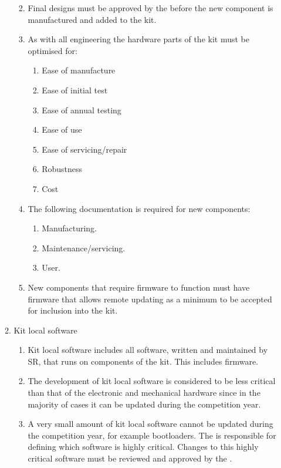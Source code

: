 \begin{draft}
\begin{enumerate}
\begin{enumerate}
\begin{enumerate}
\begin{enumerate}
          \end{enumerate}
        \item Final designs must be approved by the  before the new component is manufactured and added to the kit.
        \item As with all engineering the hardware parts of the kit must be optimised for:
          \begin{enumerate}
            \item Ease of manufacture
            \item Ease of initial test
            \item Ease of annual testing
            \item Ease of use
            \item Ease of servicing/repair
            \item Robustness
            \item Cost
          \end{enumerate}
        \item The following documentation is required for new components:
          \begin{enumerate}
            \item Manufacturing.
            \item Maintenance/servicing.
            \item User.
          \end{enumerate}
        \item New components that require firmware to function must have firmware that allows remote updating as a minimum to be accepted for inclusion into the kit.
      \end{enumerate}
    \item Kit local software
      \begin{enumerate}
        \item Kit local software includes all software, written and maintained by SR, that runs on components of the kit. This includes firmware.
        \item The development of kit local software is considered to be less critical than that of the electronic and mechanical hardware since in the majority of cases it can be updated during the competition year.
        \item A very small amount of kit local software cannot be updated during the competition year, for example bootloaders. The  is responsible for defining which software is highly critical. Changes to this highly critical software must be reviewed and approved by the .

\end{enumerate}
\end{enumerate}
\end{enumerate}
\end{draft}
